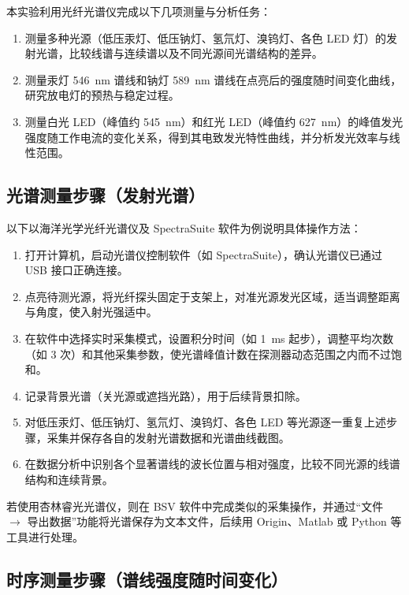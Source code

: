 \documentclass[a4paper,8pt,twocolumn]{article}
\begin{document}
本实验利用光纤光谱仪完成以下几项测量与分析任务：
\begin{enumerate}[label=\arabic*)]
  \item 测量多种光源（低压汞灯、低压钠灯、氢氘灯、溴钨灯、各色 LED 灯）的发射光谱，比较线谱与连续谱以及不同光源间光谱结构的差异。
  \item 测量汞灯 \SI{546}{\nano\meter} 谱线和钠灯 \SI{589}{\nano\meter} 谱线在点亮后的强度随时间变化曲线，研究放电灯的预热与稳定过程。
  \item 测量白光 LED（峰值约 \SI{545}{\nano\meter}）和红光 LED（峰值约 \SI{627}{\nano\meter}）的峰值发光强度随工作电流的变化关系，得到其电致发光特性曲线，并分析发光效率与线性范围。
\end{enumerate}

\subsection{光谱测量步骤（发射光谱）}

以下以海洋光学光纤光谱仪及 SpectraSuite 软件为例说明具体操作方法：

\begin{enumerate}[label=\arabic*)]
  \item 打开计算机，启动光谱仪控制软件（如 SpectraSuite），确认光谱仪已通过 USB 接口正确连接。
  \item 点亮待测光源，将光纤探头固定于支架上，对准光源发光区域，适当调整距离与角度，使入射光强适中。
  \item 在软件中选择实时采集模式，设置积分时间（如 \SI{1}{\milli\second} 起步），调整平均次数（如 3 次）和其他采集参数，使光谱峰值计数在探测器动态范围之内而不过饱和。
  \item 记录背景光谱（关光源或遮挡光路），用于后续背景扣除。
  \item 对低压汞灯、低压钠灯、氢氘灯、溴钨灯、各色 LED 等光源逐一重复上述步骤，采集并保存各自的发射光谱数据和光谱曲线截图。
  \item 在数据分析中识别各个显著谱线的波长位置与相对强度，比较不同光源的线谱结构和连续背景。
\end{enumerate}

若使用杏林睿光光谱仪，则在 BSV 软件中完成类似的采集操作，并通过“文件 $\to$ 导出数据”功能将光谱保存为文本文件，后续用 Origin、Matlab 或 Python 等工具进行处理。

\subsection{时序测量步骤（谱线强度随时间变化）}
\end{document}
